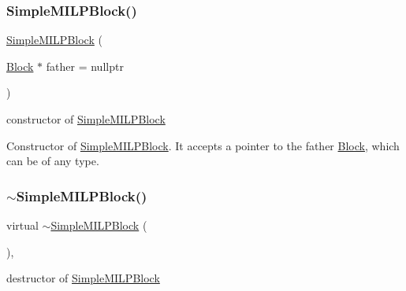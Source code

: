 \subsubsection{\texorpdfstring{Simple\+M\+I\+L\+P\+Block()}{SimpleMILPBlock()}}
{\footnotesize\ttfamily \mbox{\hyperlink{class_s_m_spp__di__unipi__it_1_1_simple_m_i_l_p_block}{Simple\+M\+I\+L\+P\+Block}} (\begin{DoxyParamCaption}\item[{\mbox{\hyperlink{class_s_m_spp__di__unipi__it_1_1_block}{Block}} $\ast$}]{father = {\ttfamily nullptr} }\end{DoxyParamCaption})\hspace{0.3cm}{\ttfamily [inline]}}



constructor of \mbox{\hyperlink{class_s_m_spp__di__unipi__it_1_1_simple_m_i_l_p_block}{Simple\+M\+I\+L\+P\+Block}} 

Constructor of \mbox{\hyperlink{class_s_m_spp__di__unipi__it_1_1_simple_m_i_l_p_block}{Simple\+M\+I\+L\+P\+Block}}. It accepts a pointer to the father \mbox{\hyperlink{class_s_m_spp__di__unipi__it_1_1_block}{Block}}, which can be of any type. \mbox{\label{class_s_m_spp__di__unipi__it_1_1_simple_m_i_l_p_block_a058b37f9df26db4fa72352790e26b296}} 
\subsubsection{\texorpdfstring{$\sim$\+Simple\+M\+I\+L\+P\+Block()}{~SimpleMILPBlock()}}
{\footnotesize\ttfamily virtual $\sim$\mbox{\hyperlink{class_s_m_spp__di__unipi__it_1_1_simple_m_i_l_p_block}{Simple\+M\+I\+L\+P\+Block}} (\begin{DoxyParamCaption}{ }\end{DoxyParamCaption})\hspace{0.3cm}{\ttfamily [inline]}, {\ttfamily [virtual]}}



destructor of \mbox{\hyperlink{class_s_m_spp__di__unipi__it_1_1_simple_m_i_l_p_block}{Simple\+M\+I\+L\+P\+Block}} 


